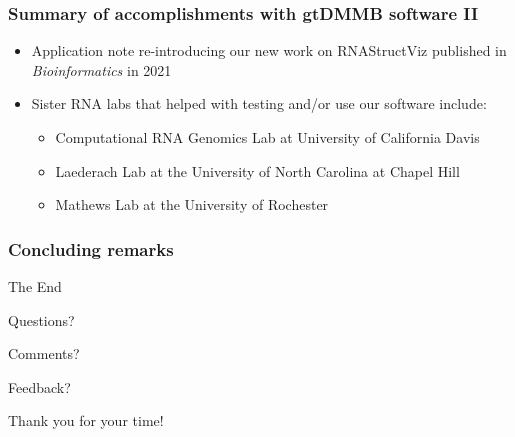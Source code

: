 \documentclass[usenames,svgnames,dvipsnames,11pt]{beamer}
\begin{document}
\begin{frame}
\frametitle{Summary of accomplishments with gtDMMB software II}
\begin{itemize} 

\item Application note re-introducing our new work on RNAStructViz 
      published in \emph{Bioinformatics} in 2021
\item Sister RNA labs that helped with testing and/or use our software include: 
	\begin{itemize}
	\item Computational RNA Genomics Lab at University of California Davis
	\item Laederach Lab at the University of North Carolina at Chapel Hill
	\item Mathews Lab at the University of Rochester
	\end{itemize}

\end{itemize}

\end{frame}

\begin{frame}
\frametitle{Concluding remarks} 

     \Huge{\centerline{The End}}\smallskip
     \Large{\centerline{Questions?}}\smallskip
     \Large{\centerline{Comments?}}\smallskip
     \Large{\centerline{Feedback?}}\bigskip
     \Huge{\centerline{Thank you for your time!}} 

\end{frame}
\end{document}
